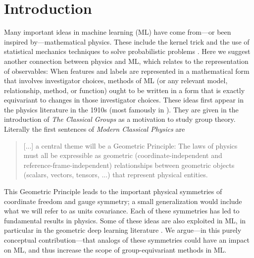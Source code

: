 \documentclass{article} %
\begin{document}
\section{Introduction}\label{sec:intro}
Many important ideas in machine learning (ML) have come from---or been inspired by---mathematical physics.
These include the kernel trick \citep{CouHil53,SchSmo02} and the use of statistical mechanics techniques to solve probabilistic problems \citep{mcmc, gibbs}.
Here we suggest another connection between physics and ML, which relates to the representation of observables:
When features and labels are represented in a mathematical form that involves investigator choices, methods of ML (or any relevant model, relationship, method, or function) ought to be written in a form that is exactly equivariant to changes in those investigator choices.
These ideas first appear in the physics literature in the 1910s (most famously in \citealt{gr}). They are given in the introduction of \textit{The Classical Groups} \citep{weyl} as a motivation to study group theory.
Literally the first sentences of \textit{Modern Classical Physics} \citep{mcp} are
\begin{quote}
[...] a central theme will be a Geometric Principle: 
The laws of physics must all
be expressible as geometric (coordinate-independent and reference-frame-independent)
relationships between geometric objects (scalars, vectors, tensors, ...) that represent
physical entities.
\end{quote}
This Geometric Principle leads to the important physical symmetries of coordinate freedom and gauge symmetry; a small generalization would include what we will refer to as units covariance.
Each of these symmetries has led to fundamental results in physics. Some of these ideas are also exploited in ML, in particular in the geometric deep learning literature \citep{bronstein2021geometric, weiler}. 
We argue---in this purely conceptual contribution---that analogs of these symmetries could have an impact on ML, and thus increase the scope of group-equivariant methods in ML.
\end{document}
